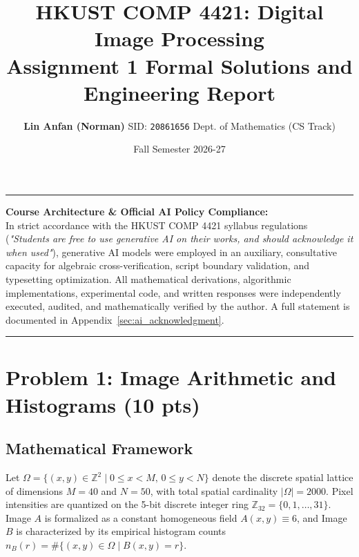 \documentclass[11pt,a4paper]{article}
\title{\vspace{-1.2cm}\LARGE\textbf{HKUST COMP 4421: Digital Image Processing}\\[0.3em]
\Large\textbf{Assignment 1 Formal Solutions and Engineering Report}}
\author{\textbf{Lin Anfan (Norman)} \quad SID: \texttt{20861656} \quad Dept. of Mathematics (CS Track)}
\date{Fall Semester 2026-27}
\begin{document}
\maketitle
\thispagestyle{fancy}

\hrule
\vspace{0.6em}
\noindent\textbf{Course Architecture \& Official AI Policy Compliance:}\\
In strict accordance with the HKUST COMP 4421 syllabus regulations (\textit{"Students are free to use generative AI on their works, and should acknowledge it when used"}), generative AI models were employed in an auxiliary, consultative capacity for algebraic cross-verification, script boundary validation, and typesetting optimization. All mathematical derivations, algorithmic implementations, experimental code, and written responses were independently executed, audited, and mathematically verified by the author. A full statement is documented in Appendix~\ref{sec:ai_acknowledgment}.
\vspace{0.5em}
\hrule
\vspace{1.0em}

\section{Problem 1: Image Arithmetic and Histograms (10 pts)}

\subsection{Mathematical Framework}
Let $\Omega = \{ (x, y) \in \mathbb{Z}^2 \mid 0 \le x < M, \, 0 \le y < N \}$ denote the discrete spatial lattice of dimensions $M = 40$ and $N = 50$, with total spatial cardinality $|\Omega| = 2000$. Pixel intensities are quantized on the 5-bit discrete integer ring $\mathbb{Z}_{32} = \{0, 1, \dots, 31\}$. Image $A$ is formalized as a constant homogeneous field $A(x, y) \equiv 6$, and Image $B$ is characterized by its empirical histogram counts $n_B(r) = \#\{(x, y) \in \Omega \mid B(x, y) = r\}$.
\end{document}
